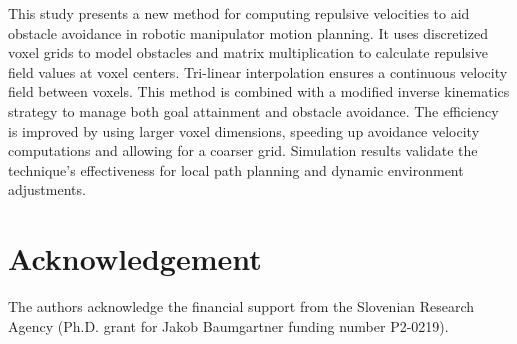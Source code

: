 \documentclass[letterpaper, 10 pt, conference]{ieeeconf}  %
\begin{document}
This study presents a new method for computing repulsive velocities to aid obstacle avoidance in robotic manipulator motion planning. It uses discretized voxel grids to model obstacles and matrix multiplication to calculate repulsive field values at voxel centers. Tri-linear interpolation ensures a continuous velocity field between voxels. This method is combined with a modified inverse kinematics strategy to manage both goal attainment and obstacle avoidance. The efficiency is improved by using larger voxel dimensions, speeding up avoidance velocity computations and allowing for a coarser grid. Simulation results validate the technique's effectiveness for local path planning and dynamic environment adjustments.



\section*{Acknowledgement}

The authors acknowledge the financial support from the Slovenian Research Agency (Ph.D. grant for Jakob Baumgartner funding number P2-0219).

\addtolength{\textheight}{-12cm}   %
\end{document}
